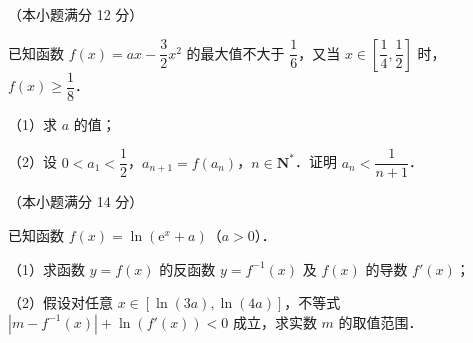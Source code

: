 \begin{question}
（本小题满分 12 分）

已知函数 $f(x) = ax - \dfrac{3}{2}x^2$ 的最大值不大于 $\dfrac{1}{6}$，又当 $x \in \left[\dfrac{1}{4}, \dfrac{1}{2}\right]$ 时，$f(x) \geqslant \dfrac{1}{8}$．

（1）求 $a$ 的值；

（2）设 $0 < a_1 < \dfrac{1}{2}$，$a_{n+1} = f(a_n)$，$n \in \mathbf{N}^*$．证明 $a_n < \dfrac{1}{n+1}$．

\end{question}
\begin{question}
（本小题满分 14 分）

已知函数 $f(x) = \ln(\mathrm{e}^x + a)$（$a > 0$）．

（1）求函数 $y = f(x)$ 的反函数 $y = f^{-1}(x)$ 及 $f(x)$ 的导数 $f'(x)$；

（2）假设对任意 $x \in [\ln(3a), \ln(4a)]$，不等式 $|m - f^{-1}(x)| + \ln(f'(x)) < 0$ 成立，求实数 $m$ 的取值范围．

\end{question}